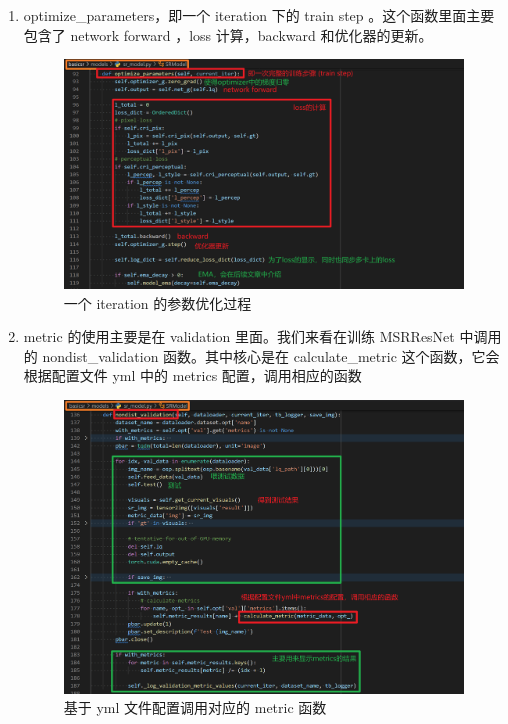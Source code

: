\documentclass[../main.tex]{subfiles}
\begin{document}
\begin{enumerate}
\begin{enumerate}
\item optimize\_parameters，即一个 iteration 下的 train step 。这个函数里面主要包含了 network forward ，loss 计算，backward 和优化器的更新。

\begin{figure}[H]
\begin{center}
    \includegraphics[width=0.7\linewidth]{figures/getting_start_18.png}
    \caption{一个 iteration 的参数优化过程}
    \label{fig:getting_start_18}
\end{center}
\vspace{-0.5cm}
\end{figure}

\item metric 的使用主要是在 validation 里面。我们来看在训练 MSRResNet 中调用的 nondist\_validation 函数。其中核心是在 calculate\_metric 这个函数，它会根据配置文件 yml 中的 metrics 配置，调用相应的函数

\begin{figure}[H]
\begin{center}
    \includegraphics[width=0.7\linewidth]{figures/getting_start_19.png}
    \caption{基于 yml 文件配置调用对应的 metric 函数}
    \label{fig:getting_start_19}
\end{center}
\vspace{-0.5cm}
\end{figure}


\end{enumerate}
\end{enumerate}
\end{document}

